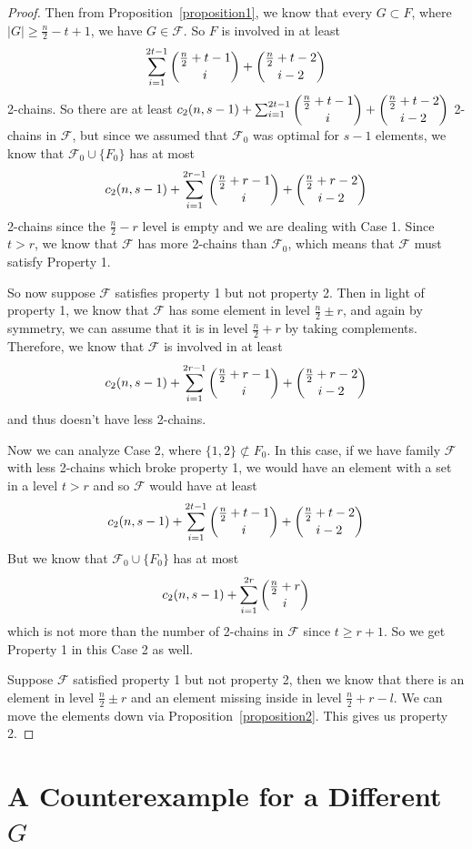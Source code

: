 \documentclass[12pt]{article}
\theoremstyle{plain}
\theoremstyle{definition}
\theoremstyle{remark}
\newcommand{\F}{\mathcal{F}}
\begin{document}
\begin{proof}
Then from Proposition~\ref{proposition1}, we know that every $G \subset F$, where $|G| \geq \frac{n}{2}-t+1$, we have $G \in \F$. So $F$ is involved in at least
\[ \sum_{i=1}^{2t-1} \dbinom{\frac{n}{2}+t - 1}{i} + \dbinom{\frac{n}{2}+t-2}{i-2}\]
2-chains. So there are at least $c_2(n, s-1) + \sum_{i=1}^{2t-1} \dbinom{\frac{n}{2}+t - 1}{i} + \dbinom{\frac{n}{2}+t-2}{i-2}$ 2-chains in $\F$, but since we assumed that $\F_0$ was optimal for $s-1$ elements, we know that $\F_0 \cup \{F_0\}$ has at most
\[ c_2(n, s-1) + \sum_{i=1}^{2r-1} \dbinom{\frac{n}{2}+r - 1}{i} + \dbinom{\frac{n}{2}+r-2}{i-2} \]
2-chains since the $\frac{n}{2}-r$ level is empty and we are dealing with Case 1. Since $t > r$, we know that $\F$ has more 2-chains than $\F_0$, which means that $\F$ must satisfy Property 1.

So now suppose $\F$ satisfies property 1 but not property 2. Then in light of property 1, we know that $\F$ has some element in level $\frac{n}{2} \pm r$, and again by symmetry, we can assume that it is in level $\frac{n}{2} + r$ by taking complements. Therefore, we know that $\F$ is involved in at least 
\[ c_2(n, s-1) + \sum_{i=1}^{2r-1} \dbinom{\frac{n}{2}+r - 1}{i} + \dbinom{\frac{n}{2}+r-2}{i-2} \]
and thus doesn't have less 2-chains. 

Now we can analyze Case 2, where $\{ 1, 2\} \not\subset F_0$. In this case, if we have family $\F$ with less 2-chains which broke property 1, we would have an element with a set in a level $t > r$ and so $\F$ would have at least
\[ c_2(n, s-1) + \sum_{i=1}^{2t-1} \dbinom{\frac{n}{2}+t-1}{i} + \dbinom{\frac{n}{2}+t-2}{i-2} \]
But we know that $\F_0 \cup \{ F_0\}$ has at most
\[ c_2(n,s-1) + \sum_{i=1}^{2r} \dbinom{\frac{n}{2}+r}{i} \]
which is not more than the number of 2-chains in $\F$ since $t \geq r + 1$. So we get Property 1 in this Case 2 as well. 

Suppose $\F$ satisfied property 1 but not property 2, then we know that there is an element in level $\frac{n}{2} \pm r$ and an element missing inside in level $\frac{n}{2}+r-l$. We can move the elements down via Proposition~\ref{proposition2}. This gives us property 2. 
\end{proof}

\section{A Counterexample for a Different $G$}
\end{document}
